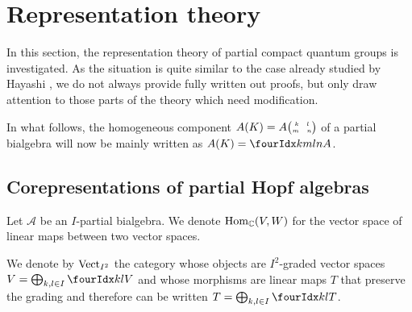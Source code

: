 \section{Representation theory}

In this section, the representation theory of partial compact quantum groups is investigated. As the situation is quite similar to the case already studied by Hayashi \cite{Hay1}, we do not always provide fully written out proofs, but only draw attention to those parts of the theory which need modification.

In what follows, the homogeneous component $A(K) = A{{\tiny \begin{pmatrix} k \quad l \\ m \quad n\end{pmatrix}}}$ of a partial bialgebra will now be mainly written as $A(K) = \Gr{A}{k}{l}{m}{n}$. 

\subsection{Corepresentations of partial Hopf algebras}


Let $\mathscr{A}$ be an $I$-partial bialgebra. We denote
$\operatorname{Hom}_{\mathbb{C}}(V,W)$ for the vector space of linear maps between two vector
spaces.


We denote by $\mathrm{Vect}_{I^{2}}$ the category whose objects are $I^{2}$-graded
vector spaces $V=\bigoplus_{k,l\in I} \Gru{V}{k}{l}$ and whose
morphisms are linear maps $T$ that preserve the grading and therefore
can be written $T=\bigoplus_{k,l\in I} \Gru{T}{k}{l}$. 

    

